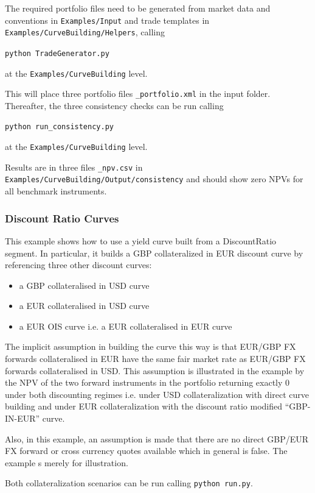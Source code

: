 \medskip
The required portfolio files need to be generated from market data and conventions in
{\tt Examples/Input} and trade templates in 
{\tt Examples/CurveBuilding/Helpers}, calling

\medskip
\centerline{\tt python TradeGenerator.py} at the {\tt Examples/CurveBuilding} level.

\medskip
This will place three portfolio files {\tt *\_portfolio.xml} in the input folder.
Thereafter, the three consistency checks can be run calling

\medskip
\centerline{\tt python run\_consistency.py} at the {\tt Examples/CurveBuilding} level.

\medskip
Results are in three files {\tt *\_npv.csv} in {\tt Examples/CurveBuilding/Output/consistency}
and should show zero NPVs for all benchmark instruments.

\subsubsection{Discount Ratio Curves}

This example shows how to use a yield curve built from a DiscountRatio segment. 
In particular, it builds a GBP collateralized in EUR discount curve by referencing 
three other discount curves:
\begin{itemize}
\item a GBP collateralised in USD curve
\item a EUR collateralised in USD curve
\item a EUR OIS curve i.e. a EUR collateralised in EUR curve
\end{itemize}

The implicit assumption in building the curve this way is that EUR/GBP FX 
forwards collateralised in EUR have the same fair market rate as EUR/GBP 
FX forwards collateralised in USD. This assumption is illustrated in the 
example by the NPV of the two forward instruments in the portfolio returning 
exactly 0 under both discounting regimes i.e. under USD collateralization with 
direct curve building and under EUR collateralization with the discount ratio 
modified ``GBP-IN-EUR'' curve.

Also, in this example, an assumption is made that there are no direct GBP/EUR FX 
forward or cross currency quotes available which in general is false. The example 
s merely for illustration.

Both collateralization scenarios can be run calling {\tt python run.py}.

